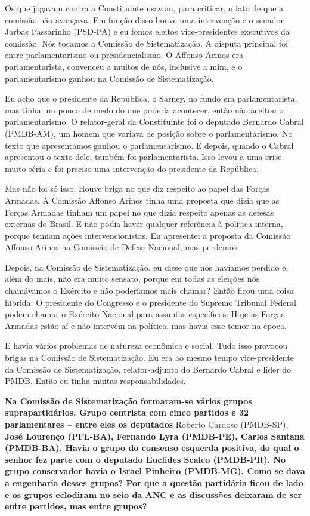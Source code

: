 Os que jogavam contra a Constituinte usavam, para criticar, o fato de
que a comissão não avançava. Em função disso houve uma intervenção e o
senador Jarbas Passarinho (PSD-PA) e eu fomos eleitos vice-presidentes
executivos da comissão. Nós tocamos a Comissão de Sistematização. A
disputa principal foi entre parlamentarismo ou presidencialismo. O
Affonso Arinos era parlamentarista, convenceu a muitos de nós, inclusive
a mim, e o parlamentarismo ganhou na Comissão de Sistematização.

Eu acho que o presidente da República, o Sarney, no fundo era
parlamentarista, mas tinha um pouco de medo do que poderia acontecer,
então não aceitou o parlamentarismo. O relator-geral da Constituinte foi
o deputado Bernardo Cabral (PMDB-AM), um homem que variava de posição
sobre o parlamentarismo. No texto que apresentamos ganhou o
parlamentarismo. E depois, quando o Cabral apresentou o texto dele,
também foi parlamentarista. Isso levou a uma crise muito séria e foi
preciso uma intervenção do presidente da República.

Mas não foi só isso. Houve briga no que diz respeito ao papel das Forças
Armadas. A Comissão Affonso Arinos tinha uma proposta que dizia que as
Forças Armadas tinham um papel no que dizia respeito apenas as defesas
externas do Brasil. E não podia haver qualquer referência à política
interna, porque temiam ações intervencionistas. Eu apresentei a proposta
da Comissão Affonso Arinos na Comissão de Defesa Nacional, mas perdemos.

Depois, na Comissão de Sistematização, eu disse que nós havíamos perdido
e, além do mais, não era muito sensato, porque em todas as eleições nós
chamávamos o Exército e não poderíamos mais chamar? Então ficou uma
coisa híbrida. O presidente do Congresso e o presidente do Supremo
Tribunal Federal podem chamar o Exército Nacional para assuntos
específicos. Hoje as Forças Armadas estão aí e não intervêm na política,
mas havia esse temor na época.

E havia vários problemas de natureza econômica e social. Tudo isso
provocou brigas na Comissão de Sistematização. Eu era ao mesmo tempo
vice-presidente da Comissão de Sistematização, relator-adjunto do
Bernardo Cabral e líder do PMDB. Então eu tinha muitas
responsabilidades.

\textbf{Na Comissão de Sistematização formaram-se vários grupos
suprapartidários. Grupo centrista com cinco partidos e 32 parlamentares
-- entre eles os deputados} Roberto Cardoso (PMDB-SP), \textbf{José
Lourenço (PFL-BA), Fernando Lyra (PMDB-PE), Carlos Santana (PMDB-BA).
Havia o grupo do consenso esquerda positiva, do qual o senhor fez parte
com o deputado Euclides Scalco (PMDB-PR). No grupo conservador havia o
Israel Pinheiro (PMDB-MG). Como se dava a engenharia desses grupos? Por
que a questão partidária ficou de lado e os grupos eclodiram no seio da
ANC e as discussões deixaram de ser entre partidos, mas entre grupos? }


